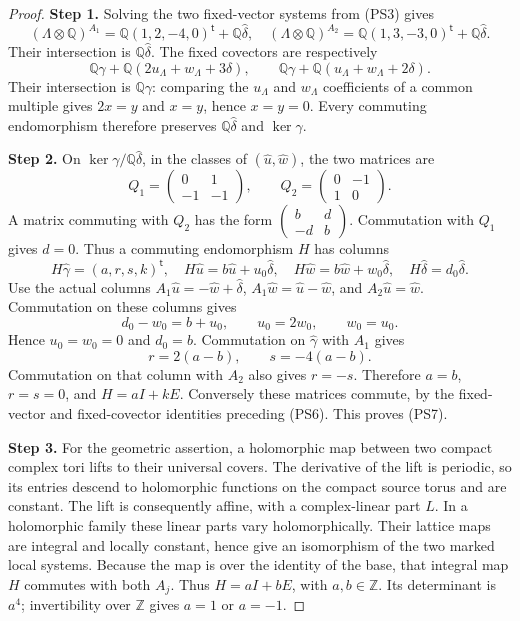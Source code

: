 \documentclass[11pt,a4paper]{article}
\theoremstyle{plain}
\theoremstyle{definition}
\begin{document}
\begin{proof}
\par\smallskip\noindent\textbf{Step 1.} Solving the two fixed-vector systems from (PS3) gives
\[
 (\Lambda\otimes\mathbb Q)^{A_1}
   =\mathbb Q(1,2,-4,0)^{\mathsf t}+\mathbb Q\widehat\delta,
 \quad
 (\Lambda\otimes\mathbb Q)^{A_2}
   =\mathbb Q(1,3,-3,0)^{\mathsf t}+\mathbb Q\widehat\delta.
\]
Their intersection is $\mathbb Q\widehat\delta$. The fixed covectors
are respectively
\[
 \mathbb Q\gamma+\mathbb Q(2u_{\Lambda}+w_{\Lambda}+3\delta),\qquad
 \mathbb Q\gamma+\mathbb Q(u_{\Lambda}+w_{\Lambda}+2\delta).
\]
Their intersection is $\mathbb Q\gamma$: comparing the $u_{\Lambda}$ and $w_{\Lambda}$
coefficients of a common multiple gives $2x=y$ and $x=y$, hence
$x=y=0$. Every commuting endomorphism therefore preserves
$\mathbb Q\widehat\delta$ and $\ker\gamma$.

\par\smallskip\noindent\textbf{Step 2.} On $\ker\gamma/\mathbb Q\widehat\delta$, in the classes of
$(\widehat u,\widehat w)$, the two matrices are
\[
 Q_1=\begin{pmatrix}0&1\\-1&-1\end{pmatrix},\qquad
 Q_2=\begin{pmatrix}0&-1\\1&0\end{pmatrix}.
\]
A matrix commuting with $Q_2$ has the form
$\left(\begin{smallmatrix}b&d\\-d&b\end{smallmatrix}\right)$.
Commutation with $Q_1$ gives $d=0$. Thus a commuting endomorphism $H$
has columns
\[
 H\widehat\gamma=(a,r,s,k)^{\mathsf t},\quad
 H\widehat u=b\widehat u+u_0\widehat\delta,\quad
 H\widehat w=b\widehat w+w_0\widehat\delta,\quad
 H\widehat\delta=d_0\widehat\delta.
\]
Use the actual columns $A_1\widehat u=-\widehat w+\widehat\delta$,
$A_1\widehat w=\widehat u-\widehat w$, and
$A_2\widehat u=\widehat w$. Commutation on these columns gives
\[
 d_0-w_0=b+u_0,\qquad u_0=2w_0,\qquad w_0=u_0.
\]
Hence $u_0=w_0=0$ and $d_0=b$. Commutation on
$\widehat\gamma$ with $A_1$ gives
\[
 r=2(a-b),\qquad s=-4(a-b).
\]
Commutation on that column with $A_2$ also gives $r=-s$.
Therefore $a=b$, $r=s=0$, and $H=aI+kE$. Conversely these matrices
commute, by the fixed-vector and fixed-covector identities preceding
(PS6). This proves (PS7).

\par\smallskip\noindent\textbf{Step 3.} For the geometric assertion, a holomorphic map between two compact
complex tori lifts to their universal covers. The derivative of the
lift is periodic, so its entries descend to holomorphic functions on
the compact source torus and are constant. The lift is consequently
affine, with a complex-linear part $L$. In a holomorphic family these
linear parts vary holomorphically. Their lattice maps are integral
and locally constant, hence give an isomorphism of the two marked
local systems. Because the map is over the identity of the base,
that integral map $H$ commutes with both $A_j$. Thus
$H=aI+bE$, with $a,b\in\mathbb Z$. Its determinant is $a^4$;
invertibility over $\mathbb Z$ gives $a=1$ or $a=-1$.


\end{proof}
\end{document}

